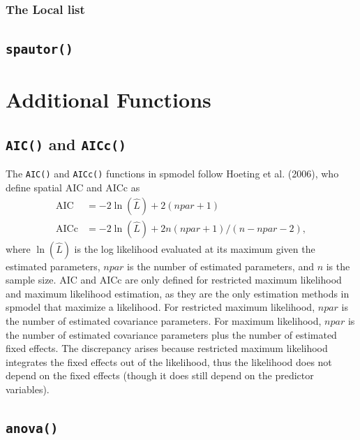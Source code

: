 \documentclass{article}
\begin{document}
\hypertarget{the-local-list}{%
\subsubsection{The Local list}\label{the-local-list}}

\hypertarget{spautor}{%
\subsection{\texorpdfstring{\texttt{spautor()}}{spautor()}}\label{spautor}}

\hypertarget{additional-functions-1}{%
\section{Additional Functions}\label{additional-functions-1}}

\hypertarget{aic-and-aicc}{%
\subsection{\texorpdfstring{\texttt{AIC()} and
\texttt{AICc()}}{AIC() and AICc()}}\label{aic-and-aicc}}

The \texttt{AIC()} and \texttt{AICc()} functions in spmodel follow
Hoeting et al. (2006), who define spatial AIC and AICc as
\begin{equation*}\label{eq:sp_aic}
  \begin{split}
    \text{AIC} & = -2\ln(\hat{L}) + 2(npar + 1) \\
    \text{AICc} & = -2\ln(\hat{L}) + 2n(npar + 1) / (n - npar - 2),
  \end{split}
\end{equation*} where \(\ln(\hat{L})\) is the log likelihood evaluated
at its maximum given the estimated parameters, \(npar\) is the number of
estimated parameters, and \(n\) is the sample size. AIC and AICc are
only defined for restricted maximum likelihood and maximum likelihood
estimation, as they are the only estimation methods in spmodel that
maximize a likelihood. For restricted maximum likelihood, \(npar\) is
the number of estimated covariance parameters. For maximum likelihood,
\(npar\) is the number of estimated covariance parameters plus the
number of estimated fixed effects. The discrepancy arises because
restricted maximum likelihood integrates the fixed effects out of the
likelihood, thus the likelihood does not depend on the fixed effects
(though it does still depend on the predictor variables).

\hypertarget{anova}{%
\subsection{\texorpdfstring{\texttt{anova()}}{anova()}}\label{anova}}
\end{document}
